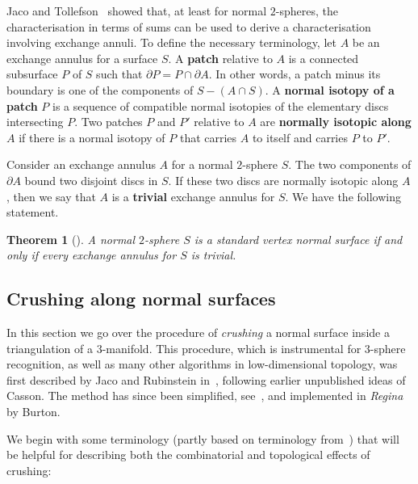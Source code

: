 \documentclass[10pt,a4paper]{amsart}
\newtheorem{theorem}{Theorem}
\begin{document}
Jaco and Tollefson~\cite{jaco1995algorithms} showed that, at least for normal $2$-spheres,
the characterisation in terms of sums can be used to derive a characterisation involving exchange annuli.
To define the necessary terminology, let $A$ be an exchange annulus for a surface $S$.
A \textbf{patch} relative to $A$ is a connected subsurface $P$ of $S$ such that $\partial P = P\cap\partial A$.
In other words, a patch minus its boundary is one of the components of $S-(A\cap S)$.
A \textbf{normal isotopy of a patch} $P$ is a sequence of compatible normal isotopies of the elementary discs intersecting $P$.
Two patches $P$ and $P'$ relative to $A$ are \textbf{normally isotopic along} $A$ if there is
a normal isotopy of $P$ that carries $A$ to itself and carries $P$ to $P'$.

Consider an exchange annulus $A$ for a normal $2$-sphere $S$.
The two components of $\partial A$ bound two disjoint discs in $S$.
If these two discs are normally isotopic along $A$, then we say that $A$ is a \textbf{trivial} exchange annulus for $S$. We have the following statement.

\begin{theorem}[{\cite[Theorem~4.1]{jaco1995algorithms}}]\label{thm:jacoTollefsonExchange}
A normal $2$-sphere $S$ is a standard vertex normal surface if and only if every exchange annulus for $S$ is trivial.
\end{theorem}

\subsection{Crushing along normal surfaces}\label{ssec:intermediateCell}

In this section we go over the procedure of {\em crushing} a normal surface inside a triangulation of a $3$-manifold.
This procedure, which is instrumental for $3$-sphere recognition, as well as many other algorithms
in low-dimensional topology, was first described by Jaco and Rubinstein in~\cite{jaco2003efficient}, following earlier unpublished ideas of Casson.
The method has since been simplified, see~\cite{burton2014crushing}, and implemented in {\em Regina}~\cite{Regina} by Burton.

We begin with some terminology (partly based on terminology from~{\cite[p.~91]{jaco2003efficient}}) that will be helpful for describing both the combinatorial and topological effects of crushing:
\end{document}
